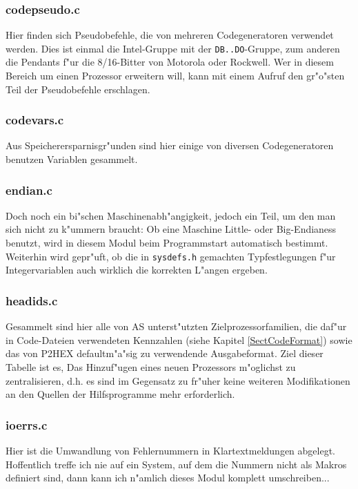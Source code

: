 \documentclass[12pt,a4paper,twoside]{report}
\newcommand{\tty}[1]{{\tt #1}}
\newcommand{\asname}{AS}
\begin{document}
\subsubsection{codepseudo.c}

Hier finden sich Pseudobefehle, die von mehreren Codegeneratoren verwendet
werden.  Dies ist einmal die Intel-Gruppe mit der \tty{DB..DO}-Gruppe,
zum anderen die Pendants f"ur die 8/16-Bitter von Motorola oder Rockwell.
Wer in diesem Bereich um einen Prozessor erweitern will, kann mit einem
Aufruf den gr"o"sten Teil der Pseudobefehle erschlagen.

\subsubsection{codevars.c}

Aus Speicherersparnisgr"unden sind hier einige von diversen
Codegeneratoren benutzen Variablen gesammelt.

\subsubsection{endian.c}

Doch noch ein bi"schen Maschinenabh"angigkeit, jedoch ein Teil, um den man
sich nicht zu k"ummern braucht: Ob eine Maschine Little- oder
Big-Endianess benutzt, wird in diesem Modul beim Programmstart automatisch
bestimmt.  Weiterhin wird gepr"uft, ob die in {\tt sysdefs.h} gemachten
Typfestlegungen f"ur Integervariablen auch wirklich die korrekten L"angen
ergeben.

\subsubsection{headids.c}

Gesammelt sind hier alle von \asname{} unterst"utzten Zielprozessorfamilien, die
daf"ur in Code-Dateien verwendeten Kennzahlen (siehe Kapitel
\ref{SectCodeFormat}) sowie das von P2HEX defaultm"a"sig zu verwendende
Ausgabeformat.  Ziel dieser Tabelle ist es, Das Hinzuf"ugen eines neuen
Prozessors m"oglichst zu zentralisieren, d.h. es sind im Gegensatz zu
fr"uher keine weiteren Modifikationen an den Quellen der Hilfsprogramme
mehr erforderlich.

\subsubsection{ioerrs.c}

Hier ist die Umwandlung von Fehlernummern in Klartextmeldungen abgelegt.
Hoffentlich treffe ich nie auf ein System, auf dem die Nummern nicht als
Makros definiert sind, dann kann ich n"amlich dieses Modul komplett
umschreiben...
\end{document}

